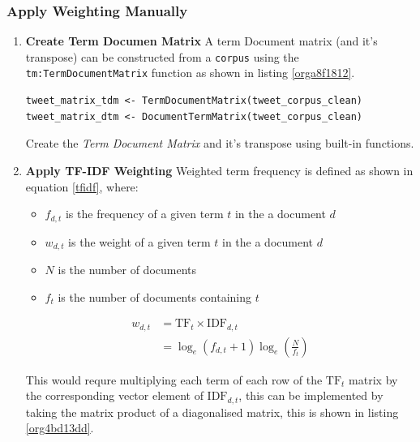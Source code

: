 \documentclass[11pt]{article}
\begin{document}
\subsubsection{Apply Weighting Manually}
\label{sec:org2d803c5}
\begin{enumerate}
\item \textbf{Create Term Documen Matrix}
\label{sec:org5afa758}
\newline
A term Document matrix (and it's transpose) can be constructed from a \texttt{corpus} using the
\texttt{tm:TermDocumentMatrix} function as shown in listing \ref{orga8f1812}.

\begin{listing}[htbp]
\begin{verbatim}
tweet_matrix_tdm <- TermDocumentMatrix(tweet_corpus_clean)
tweet_matrix_dtm <- DocumentTermMatrix(tweet_corpus_clean)
\end{verbatim}
\caption{\label{orga8f1812}Create the \emph{Term Document Matrix} and it's transpose using built-in functions.}
\end{listing}

\item \textbf{Apply TF-IDF Weighting}
\label{sec:orgabbb749}
\newline
Weighted term frequency is defined as shown in equation \eqref{tfidf}, where:

\begin{itemize}
\item \(f_{d,t}\) is the frequency of a given term \(t\) in the a document \(d\)
\item \(w_{d,t}\) is the weight of a given term \(t\) in the a document \(d\)
\item \(N\) is the number of documents
\item \(f_{t}\) is the number of documents containing \(t\)
\end{itemize}

\begin{equation}\begin{aligned}
w_{d, t} &=\mathrm{TF}_{t} \times \mathrm{IDF}_{d, t} \\
&=\log _{e}\left(f_{d, t}+1\right) \log _{e}\left(\frac{N}{f_{t}}\right) \label{tfidf}
\end{aligned}\end{equation}

This would requre multiplying each term of each row of the \(\mathrm{TF}_{t}\) matrix by the corresponding vector element of \(\mathrm{IDF}_{d,t}\), this can be implemented by taking the matrix product of a diagonalised matrix, this is shown in listing \ref{org4bd13dd}.


\end{enumerate}
\end{document}
